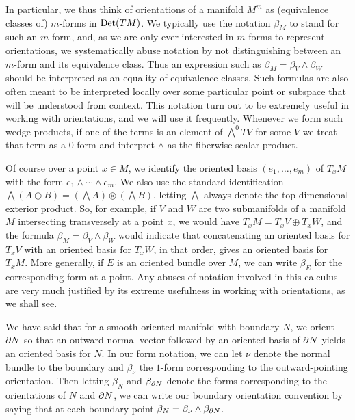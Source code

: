 
In particular, we thus think of orientations of a manifold $M^m$ as (equivalence classes of) $m$-forms in ${\rm Det}(TM)$.
We typically use the notation $\beta_M$ to stand for such an $m$-form, and, as we are only ever interested in $m$-forms to represent orientations, we systematically abuse notation by not distinguishing between an $m$-form and its equivalence class. 
Thus an expression such as $\beta_M = \beta_V \wedge \beta_W$ should be interpreted as an equality of equivalence classes. 
Such formulas are also often meant to be interpreted locally over some particular point or subspace that will be understood from context. 
This notation turn out to be extremely useful in working with orientations, and we will use it frequently.
Whenever we form such wedge products, if one of the terms is an element of $\bigwedge^0 TV$ for some $V$ we treat that term as a $0$-form and interpret $\wedge$ as the fiberwise scalar product.

Of course over a point $x \in M$, we identify the oriented basis $(e_1,\ldots, e_m)$ of $T_xM$ with the form $e_1 \wedge \cdots \wedge e_m$. 
We also use the standard identification $\bigwedge (A\oplus B)=(\bigwedge A )\otimes (\bigwedge B)$, letting $\bigwedge$ always denote the top-dimensional exterior product. 
So, for example, if $V$ and $W$ are two submanifolds of a manifold $M$ intersecting transversely at a point $x$, we would have $T_xM = T_xV\oplus T_xW$, and the formula $\beta_M = \beta_V \wedge \beta_W$ would indicate that concatenating an oriented basis for $T_xV$ with an oriented basis for $T_xW$, in that order, gives an oriented basis for $T_xM$. 
More generally, if $E$ is an oriented bundle over $M$, we can write $\beta_E$ for the corresponding form at a point. 
Any abuses of notation involved in this calculus are very much justified by its extreme usefulness in working with orientations, as we shall see.

\begin{example}
We have said that for a smooth oriented manifold with boundary $N$, we orient $\partial N$ so that an outward normal vector followed by an oriented basis of $\partial N$ yields an oriented basis for $N$. 
In our form notation, we can let $\nu$ denote the normal bundle to the boundary and $\beta_{\nu}$ the $1$-form corresponding to the outward-pointing orientation. 
Then letting $\beta_N$ and $\beta_{\partial N}$ denote the forms corresponding to the orientations of $N$ and $\partial N$, we can write our boundary orientation convention by saying that at each boundary point $\beta_N=\beta_\nu\wedge \beta_{\partial N}$.
\end{example}



